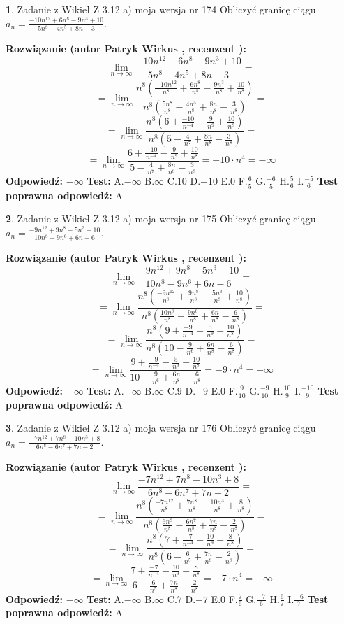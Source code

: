 \documentclass[12pt, a4paper]{article}
\theoremstyle{definition} %
\newtheorem{zad}{}
\newcommand{\zadStart}[1]{\begin{zad}#1\newline}
\newcommand{\zadStop}{\end{zad}}
\newcommand{\rozwStart}[2]{\noindent \textbf{Rozwiązanie (autor #1 , recenzent #2): }\newline}
\newcommand{\rozwStop}{\newline}
\newcommand{\odpStart}{\noindent \textbf{Odpowiedź:}\newline}
\newcommand{\odpStop}{\newline}
\newcommand{\testStart}{\noindent \textbf{Test:}\newline}
\newcommand{\testStop}{\newline}
\newcommand{\kluczStart}{\noindent \textbf{Test poprawna odpowiedź:}\newline}
\newcommand{\kluczStop}{\newline}
\begin{document}
\zadStart{Zadanie z Wikieł Z 3.12 a) moja wersja nr 174}
Obliczyć granicę ciągu $a_{n}=\frac{-10n^{12}+6n^{8}-9n^{3}+10}{5n^{8}-4n^{5}+8n-3}$.
\zadStop
\rozwStart{Patryk Wirkus}{}
$$\lim\limits_{n\to\infty}\frac{-10n^{12}+6n^{8}-9n^{3}+10}{5n^{8}-4n^{5}+8n-3}=$$
$$=\lim\limits_{n\to\infty}\frac{n^{8}\left(\frac{-10n^{12}}{n^{8}}+\frac{6n^{8}}{n^{8}}-\frac{9n^{3}}{n^{8}}+\frac{10}{n^{8}}\right)}{n^{8}\left(\frac{5n^{8}}{n^{8}}-\frac{4n^{5}}{n^{8}}+\frac{8n}{n^{8}}-\frac{3}{n^{8}}\right)}=$$
$$=\lim\limits_{n\to\infty}\frac{n^{8}\left(6+\frac{-10}{n^{-4}}-\frac{9}{n^{9}}+\frac{10}{n^{8}}\right)}
{n^{8}\left(5-\frac{4}{n^{7}}+\frac{8n}{n^{8}}-\frac{3}{n^{8}}\right)}=$$
$$=\lim\limits_{n\to\infty}\frac{6+\frac{-10}{n^{-4}}-\frac{9}{n^{9}}+\frac{10}{n^{8}}}{5-\frac{4}{n^{7}}+\frac{8n}{n^{8}}-\frac{3}{n^{8}}}=-10\cdot n^{4} = -\infty$$
\rozwStop
\odpStart
$-\infty$
\odpStop
\testStart
A.$-\infty$
B.$\infty$
C.$10$
D.$-10$
E.$0$
F.$\frac{6}{5}$
G.$\frac{-6}{5}$
H.$\frac{5}{6}$
I.$\frac{-5}{6}$
\testStop
\kluczStart
A
\kluczStop



\zadStart{Zadanie z Wikieł Z 3.12 a) moja wersja nr 175}
Obliczyć granicę ciągu $a_{n}=\frac{-9n^{12}+9n^{8}-5n^{3}+10}{10n^{8}-9n^{6}+6n-6}$.
\zadStop
\rozwStart{Patryk Wirkus}{}
$$\lim\limits_{n\to\infty}\frac{-9n^{12}+9n^{8}-5n^{3}+10}{10n^{8}-9n^{6}+6n-6}=$$
$$=\lim\limits_{n\to\infty}\frac{n^{8}\left(\frac{-9n^{12}}{n^{8}}+\frac{9n^{8}}{n^{8}}-\frac{5n^{3}}{n^{8}}+\frac{10}{n^{8}}\right)}{n^{8}\left(\frac{10n^{8}}{n^{8}}-\frac{9n^{6}}{n^{8}}+\frac{6n}{n^{8}}-\frac{6}{n^{8}}\right)}=$$
$$=\lim\limits_{n\to\infty}\frac{n^{8}\left(9+\frac{-9}{n^{-4}}-\frac{5}{n^{9}}+\frac{10}{n^{8}}\right)}
{n^{8}\left(10-\frac{9}{n^{6}}+\frac{6n}{n^{8}}-\frac{6}{n^{8}}\right)}=$$
$$=\lim\limits_{n\to\infty}\frac{9+\frac{-9}{n^{-4}}-\frac{5}{n^{9}}+\frac{10}{n^{8}}}{10-\frac{9}{n^{6}}+\frac{6n}{n^{8}}-\frac{6}{n^{8}}}=-9\cdot n^{4} = -\infty$$
\rozwStop
\odpStart
$-\infty$
\odpStop
\testStart
A.$-\infty$
B.$\infty$
C.$9$
D.$-9$
E.$0$
F.$\frac{9}{10}$
G.$\frac{-9}{10}$
H.$\frac{10}{9}$
I.$\frac{-10}{9}$
\testStop
\kluczStart
A
\kluczStop



\zadStart{Zadanie z Wikieł Z 3.12 a) moja wersja nr 176}
Obliczyć granicę ciągu $a_{n}=\frac{-7n^{12}+7n^{8}-10n^{3}+8}{6n^{8}-6n^{7}+7n-2}$.
\zadStop
\rozwStart{Patryk Wirkus}{}
$$\lim\limits_{n\to\infty}\frac{-7n^{12}+7n^{8}-10n^{3}+8}{6n^{8}-6n^{7}+7n-2}=$$
$$=\lim\limits_{n\to\infty}\frac{n^{8}\left(\frac{-7n^{12}}{n^{8}}+\frac{7n^{8}}{n^{8}}-\frac{10n^{3}}{n^{8}}+\frac{8}{n^{8}}\right)}{n^{8}\left(\frac{6n^{8}}{n^{8}}-\frac{6n^{7}}{n^{8}}+\frac{7n}{n^{8}}-\frac{2}{n^{8}}\right)}=$$
$$=\lim\limits_{n\to\infty}\frac{n^{8}\left(7+\frac{-7}{n^{-4}}-\frac{10}{n^{9}}+\frac{8}{n^{8}}\right)}
{n^{8}\left(6-\frac{6}{n^{5}}+\frac{7n}{n^{8}}-\frac{2}{n^{8}}\right)}=$$
$$=\lim\limits_{n\to\infty}\frac{7+\frac{-7}{n^{-4}}-\frac{10}{n^{9}}+\frac{8}{n^{8}}}{6-\frac{6}{n^{5}}+\frac{7n}{n^{8}}-\frac{2}{n^{8}}}=-7\cdot n^{4} = -\infty$$
\rozwStop
\odpStart
$-\infty$
\odpStop
\testStart
A.$-\infty$
B.$\infty$
C.$7$
D.$-7$
E.$0$
F.$\frac{7}{6}$
G.$\frac{-7}{6}$
H.$\frac{6}{7}$
I.$\frac{-6}{7}$
\testStop
\kluczStart
A
\kluczStop
\end{document}
